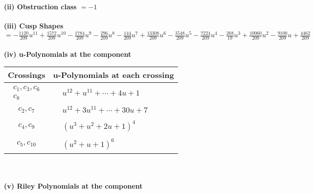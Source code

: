 \documentclass[1p]{elsarticle_modified}
\theoremstyle{definition}
\begin{document}
\flushleft \textbf{(ii) Obstruction class $= -1$}\\~\\
\flushleft \textbf{(iii) Cusp Shapes $= -\frac{1120}{209} u^{11}+\frac{1572}{209} u^{10}-\frac{1784}{209} u^9-\frac{296}{209} u^8-\frac{144}{209} u^7+\frac{13308}{209} u^6-\frac{3548}{209} u^5-\frac{7224}{209} u^4-\frac{268}{19} u^3+\frac{10060}{209} u^2-\frac{9100}{209} u+\frac{4462}{209}$}\\~\\
\newpage\renewcommand{\arraystretch}{1}
\flushleft \textbf{(iv) u-Polynomials at the component}\newline \\
\begin{tabular}{m{50pt}|m{274pt}}
Crossings & \hspace{64pt}u-Polynomials at each crossing \\
\hline $$\begin{aligned}c_{1},c_{3},c_{6}\\c_{8}\end{aligned}$$&$\begin{aligned}
&u^{12}+u^{11}+\cdots+4 u+1
\end{aligned}$\\
\hline $$\begin{aligned}c_{2},c_{7}\end{aligned}$$&$\begin{aligned}
&u^{12}+3 u^{11}+\cdots+30 u+7
\end{aligned}$\\
\hline $$\begin{aligned}c_{4},c_{9}\end{aligned}$$&$\begin{aligned}
&(u^3+u^2+2 u+1)^4
\end{aligned}$\\
\hline $$\begin{aligned}c_{5},c_{10}\end{aligned}$$&$\begin{aligned}
&(u^2+u+1)^6
\end{aligned}$\\
\hline
\end{tabular}\\~\\
\newpage\renewcommand{\arraystretch}{1}
\flushleft \textbf{(v) Riley Polynomials at the component}\newline \\
\end{document}
